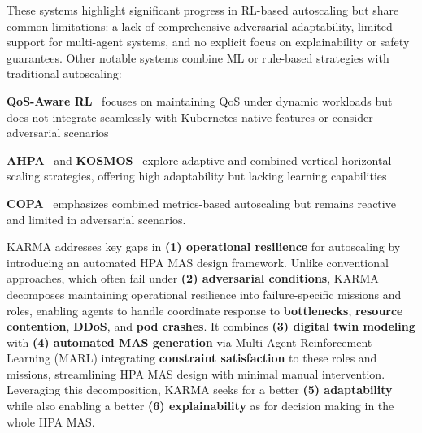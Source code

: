 \documentclass[conference]{IEEEtran}
\begin{document}
These systems highlight significant progress in RL-based autoscaling but share common limitations: a lack of comprehensive adversarial adaptability, limited support for multi-agent systems, and no explicit focus on explainability or safety guarantees.
%
Other notable systems combine ML or rule-based strategies with traditional autoscaling:
%
\begin{enumerate*}[label={}, itemjoin={;\quad }]
    \item \textbf{QoS-Aware RL}~\cite{QoSRL} focuses on maintaining QoS under dynamic workloads but does not integrate seamlessly with Kubernetes-native features or consider adversarial scenarios
    \item \textbf{AHPA}~\cite{AHPA} and \textbf{KOSMOS}~\cite{KOSMOS} explore adaptive and combined vertical-horizontal scaling strategies, offering high adaptability but lacking learning capabilities
    \item \textbf{COPA}~\cite{COPA} emphasizes combined metrics-based autoscaling but remains reactive and limited in adversarial scenarios.
\end{enumerate*}

KARMA addresses key gaps in \textbf{(1) operational resilience} for autoscaling by introducing an automated HPA MAS design framework. Unlike conventional approaches, which often fail under \textbf{(2) adversarial conditions}, KARMA decomposes maintaining operational resilience into failure-specific missions and roles, enabling agents to handle coordinate response to \textbf{bottlenecks}, \textbf{resource contention}, \textbf{DDoS}, and \textbf{pod crashes}. It combines \textbf{(3) digital twin modeling} with \textbf{(4) automated MAS generation} via Multi-Agent Reinforcement Learning (MARL) integrating \textbf{constraint satisfaction} to these roles and missions, streamlining HPA MAS design with minimal manual intervention. Leveraging this decomposition, KARMA seeks for a better \textbf{(5) adaptability} while also enabling a better \textbf{(6) explainability} as for decision making in the whole HPA MAS.


\end{document}
